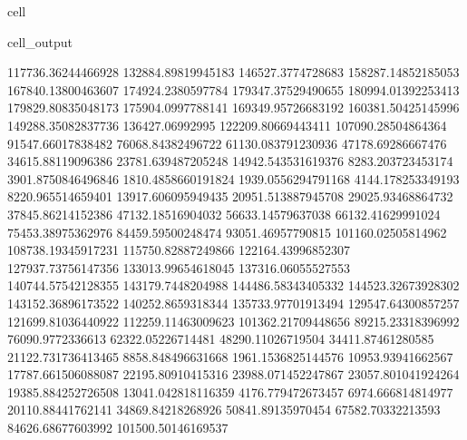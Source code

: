 \documentclass[letterpaper,10pt,english]{jupyterBook}
\begin{document}
\begin{sphinxuseclass}{cell}
\begin{sphinxVerbatimOutput}
\begin{sphinxuseclass}{cell_output}
\begin{sphinxVerbatim}[commandchars=\\\{\}]
117736.36244466928  132884.89819945183  146527.3774728683  158287.14852185053  167840.13800463607  174924.2380597784  179347.37529490655  180994.01392253413  179829.80835048173  175904.0997788141  169349.95726683192  160381.50425145996  149288.35082837736  136427.06992995  122209.80669443411  107090.28504864364  91547.66017838482  76068.84382496722  61130.083791230936  47178.69286667476  34615.88119096386  23781.639487205248  14942.543531619376  8283.203723453174  3901.8750846496846  1810.4858660191824  1939.0556294791168  4144.178253349193  8220.965514659401  13917.606095949435  20951.513887945708  29025.93468864732  37845.86214152386  47132.18516904032  56633.14579637038  66132.41629991024  75453.38975362976  84459.59500248474  93051.46957790815  101160.02505814962  108738.19345917231  115750.82887249866  122164.43996852307  127937.73756147356  133013.99654618045  137316.06055527553  140744.57542128355  143179.7448204988  144486.58343405332  144523.32673928302  143152.36896173522  140252.8659318344  135733.97701913494  129547.64300857257  121699.81036440922  112259.11463009623  101362.21709448656  89215.23318396992  76090.9772336613  62322.05226714481  48290.11026719504  34411.87461280585  21122.731736413465  8858.848496631668  \PYGZhy{}1961.1536825144576  \PYGZhy{}10953.93941662567  \PYGZhy{}17787.661506088087  \PYGZhy{}22195.80910415316  \PYGZhy{}23988.071452247867  \PYGZhy{}23057.801041924264  \PYGZhy{}19385.884252726508  \PYGZhy{}13041.042818116359  \PYGZhy{}4176.779472673457  6974.666814814977  20110.88441762141  34869.84218268926  50841.89135970454  67582.70332213593  84626.68677603992  101500.50146169537  

\end{sphinxVerbatim}
\end{sphinxuseclass}
\end{sphinxVerbatimOutput}
\end{sphinxuseclass}
\end{document}
